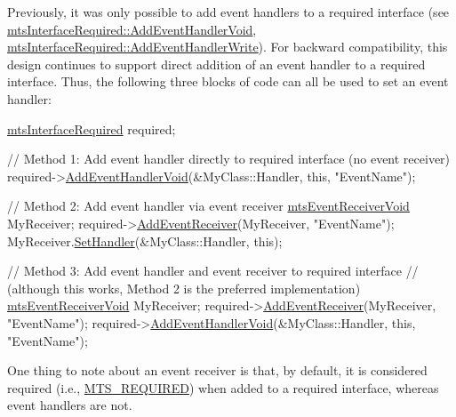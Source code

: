 Previously, it was only possible to add event handlers to a required interface (see \hyperlink{classmts_interface_required_a195ee62f3fa85dbfd1ce92cb1f745603}{mts\+Interface\+Required\+::\+Add\+Event\+Handler\+Void}, \hyperlink{classmts_interface_required_a5259260a2f54575de9bbe8b2636430b8}{mts\+Interface\+Required\+::\+Add\+Event\+Handler\+Write}). For backward compatibility, this design continues to support direct addition of an event handler to a required interface. Thus, the following three blocks of code can all be used to set an event handler\+:


\begin{DoxyCode}
\hyperlink{classmts_interface_required}{mtsInterfaceRequired} required;

\textcolor{comment}{// Method 1: Add event handler directly to required interface (no event receiver)}
required->\hyperlink{classmts_interface_required_a195ee62f3fa85dbfd1ce92cb1f745603}{AddEventHandlerVoid}(&MyClass::Handler, \textcolor{keyword}{this}, \textcolor{stringliteral}{"EventName"});

\textcolor{comment}{// Method 2: Add event handler via event receiver}
\hyperlink{classmts_event_receiver_void}{mtsEventReceiverVoid} MyReceiver;
required->\hyperlink{classmts_interface_required_aa9146d63a8b06974615f36e01151e143}{AddEventReceiver}(MyReceiver, \textcolor{stringliteral}{"EventName"});
MyReceiver.\hyperlink{classmts_event_receiver_void_afe4089691c2e13f94b76f595976552fb}{SetHandler}(&MyClass::Handler, \textcolor{keyword}{this});

\textcolor{comment}{// Method 3: Add event handler and event receiver to required interface}
\textcolor{comment}{//           (although this works, Method 2 is the preferred implementation)}
\hyperlink{classmts_event_receiver_void}{mtsEventReceiverVoid} MyReceiver;
required->\hyperlink{classmts_interface_required_aa9146d63a8b06974615f36e01151e143}{AddEventReceiver}(MyReceiver, \textcolor{stringliteral}{"EventName"});
required->\hyperlink{classmts_interface_required_a195ee62f3fa85dbfd1ce92cb1f745603}{AddEventHandlerVoid}(&MyClass::Handler, \textcolor{keyword}{this}, \textcolor{stringliteral}{"EventName"});
\end{DoxyCode}


One thing to note about an event receiver is that, by default, it is considered required (i.\+e., \hyperlink{mts_forward_declarations_8h_a9ef1ce54724afde7802db326ff8606f3ae01fd85391b60e546bbb1be9716c4ec9}{M\+T\+S\+\_\+\+R\+E\+Q\+U\+I\+R\+E\+D}) when added to a required interface, whereas event handlers are not.

